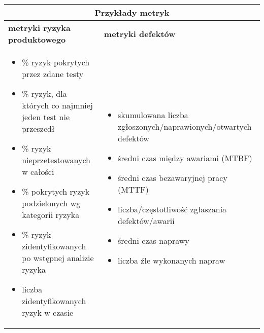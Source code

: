 \documentclass[../main.tex]{subfiles}
\begin{document}
    \begin{table}[H]
        \begin{center}
            \begin{tabular}{| p{8cm} | p{8cm} |}
                \hline
                \multicolumn{2}{|c|}{\textbf{Przykłady metryk}} \\
                \hline
                \hline
                \textbf{metryki ryzyka produktowego} & \textbf{metryki defektów} \\
                \hline
                \begin{itemize}
                    \item \% ryzyk pokrytych przez zdane testy
                    \item \% ryzyk, dla których co najmniej jeden test nie przeszedł
                    \item \% ryzyk nieprzetestowanych w całości
                    \item \% pokrytych ryzyk podzielonych wg kategorii ryzyka
                    \item \% ryzyk zidentyfikowanych po wstępnej analizie ryzyka
                    \item liczba zidentyfikowanych ryzyk w czasie
                \end{itemize}
                &
                \begin{itemize}
                    \item skumulowana liczba zgłoszonych/naprawionych/otwartych defektów
                    \item średni czas między awariami (MTBF)
                    \item średni czas bezawaryjnej pracy (MTTF)
                    \item liczba/częstotliwość zgłaszania defektów/awarii
                    \item średni czas naprawy
                    \item liczba źle wykonanych napraw
                \end{itemize} \\
                \hline
            \end{tabular}
        \end{center}
    \end{table}
\end{document}
